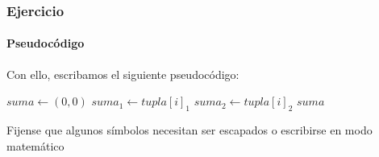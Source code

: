 \begin{frame}
\frametitle{Ejercicio}
\framesubtitle{Pseudocódigo}

Con ello, escribamos el siguiente pseudocódigo:

\begin{tcolorbox}[colframe=color1]
\begin{center}
\begin{algorithmic}
        \State $suma \gets (0,0)$
            \State $suma_1 \gets tupla[i]_1$
            \State $suma_2 \gets tupla[i]_2$
        \EndFor
        \EndIf
        \State \Return $suma$
    \EndFunction
\end{algorithmic}
\end{center}
\end{tcolorbox}

Fijense que algunos símbolos necesitan ser escapados o escribirse en modo matemático

\end{frame}